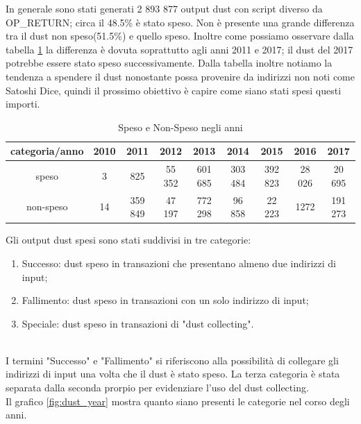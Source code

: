 In generale sono stati generati 2 893 877 output dust con script diverso da OP\_RETURN; circa il 48.5\% è stato speso. Non è presente una grande differenza tra il dust non speso(51.5\%) e quello speso. Inoltre come possiamo osservare dalla tabella \ref{tab:dust_spent_unspent} la differenza è dovuta soprattutto agli anni 2011 e 2017; il dust del 2017 potrebbe essere stato speso successivamente. Dalla tabella inoltre notiamo la tendenza a spendere il dust nonostante possa provenire da indirizzi non noti come Satoshi Dice, quindi il prossimo obiettivo è capire come siano stati spesi questi importi.
\begin{table}[H]
    \centering
    \begin{tabular}{|c|c|c|c|c|c|c|c|c|}
        \hline
           categoria/anno   & 2010 & 2011 & 2012 & 2013 & 2014 & 2015 & 2016 & 2017\\
        \hline 
         speso &  3 & 825 & 55 352 & 601 685 & 303 484 & 392 823 & 28 026 & 20 695 \\
         \hline
         non-speso & 14 & 359 849 & 47 197 & 772 298 & 96 858 & 22 223 & 1272 & 191 273  \\
         \hline
    \end{tabular}
    \caption{Speso e Non-Speso negli anni}
    \label{tab:dust_spent_unspent}
\end{table}
Gli output dust spesi sono stati suddivisi in tre categorie:
\begin{enumerate}
    \item Successo: dust speso in transazioni che presentano almeno due indirizzi di input;
    \item Fallimento: dust speso in transazioni con un solo indirizzo di input;
    \item Speciale: dust speso in transazioni di "dust collecting".
\end{enumerate}\\
I termini "Successo" e "Fallimento" si riferiscono alla possibilità di collegare gli indirizzi di input una volta che il dust è stato speso. La terza categoria è stata separata dalla seconda prorpio per evidenziare l'uso del dust collecting.\\
Il grafico \ref{fig:dust_year} mostra quanto siano presenti le categorie nel corso degli anni.

